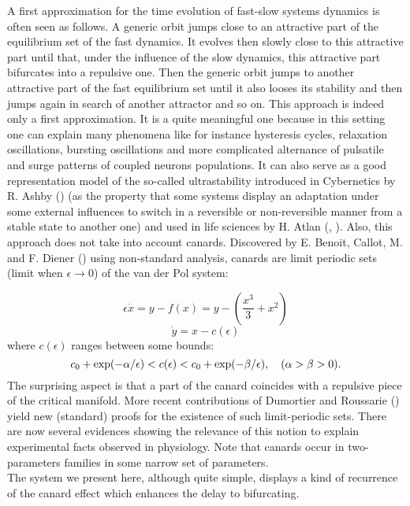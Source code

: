 \documentclass[12pt,psamsfonts]{amsart}
\begin{document}
A first approximation for the time evolution of fast-slow systems
dynamics is often seen as follows. A generic orbit jumps close to
an attractive part of the equilibrium set of the fast dynamics. It
evolves then slowly close to this attractive part until that,
 under the influence of the slow dynamics, this attractive part
bifurcates into a repulsive one. Then the generic orbit jumps to
another attractive part of the fast equilibrium set until it
 also looses its stability and then jumps again in search of
 another attractor and so on. This approach is indeed only a first
 approximation. It is a quite meaningful one because in this
 setting one can explain many phenomena like for instance
 hysteresis cycles, relaxation oscillations, bursting oscillations
 and more complicated alternance of pulsatile and surge patterns
 of coupled neurons populations. It can also serve as a good representation model
 of the so-called ultrastability introduced in Cybernetics by R. Ashby (\cite{Ash})
 (as the
 property that some systems display an adaptation under some external influences
 to switch in a reversible or non-reversible manner from a stable state to another one)
 and used in life sciences by H. Atlan (\cite{At}, \cite{Francoise}).
 \vskip 1pt
 Also, this approach does not take into account canards. Discovered by E. Benoit, Callot, M. and F.
 Diener (\cite{BCDD}) using non-standard analysis, canards are limit
 periodic sets (limit when $\epsilon\to 0$) of the van der Pol
 system:

\begin{equation}
\label{e1}
{\epsilon}\dot{x}=y-f(x)=y-(\frac{x^3}{3}+x^2)
\end{equation}
\begin{equation}
\dot{y}=x-c(\epsilon)
\end{equation}
where $c(\epsilon)$ ranges between some bounds:
\begin{equation}
\label{e2}
c_0+{\rm exp}(-\alpha/\epsilon)<c(\epsilon)<c_0+{\rm exp}(-\beta/\epsilon),
\quad (\alpha>\beta>0).
\end{equation}
The surprising aspect is that a part of the canard coincides with
a repulsive piece of the critical manifold. More recent
contributions of Dumortier and Roussarie (\cite{DR}) yield
new (standard) proofs for the existence of such limit-periodic
sets. There are now several evidences showing the relevance of
this notion to explain experimental facts observed in physiology.
Note that canards occur in two-parameters families in some narrow
set of parameters.\\
The system we present here, although quite simple,
displays a kind of recurrence of the canard effect which
enhances the delay to bifurcating.
\end{document}
